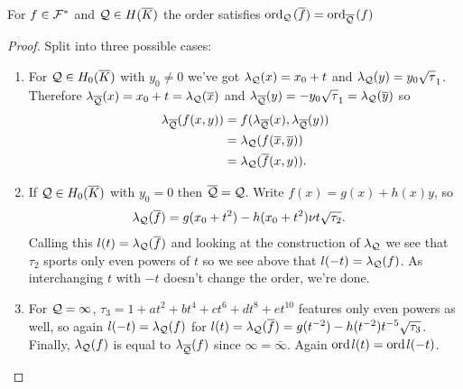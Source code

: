 \documentclass[english,11pt,a4paper]{article}
\begin{document}
\begin{lemma}\label{three}
  For $f \in \mathcal{F}^*$ and $\mathcal{Q} \in H(\overline K)$ the order satisfies $\text{ord}_{\mathcal{Q}}\hspace{0.4mm}(\overline f) = \text{ord}_{\overline {\mathcal{Q}}}\hspace{0.4mm} (f)$
  \begin{proof} Split into three possible cases:
    \begin{enumerate}[1.]
      \item For $\mathcal{Q} \in H_0(\overline K)$ with $y_0 \neq 0$ we've got $\lambda_{\mathcal{Q}}(x) = x_0 + t$ and $\lambda_{\mathcal{Q}}(y) = y_0 \sqrt \tau_1$. Therefore $\lambda_{\overline {\mathcal{Q}}}(x) = x_0 + t = \lambda_{\mathcal{Q}} (\overline x)$ and $\lambda_{\overline {\mathcal{Q}}}(y) = - y_0 \sqrt \tau_1 = \lambda_{\mathcal{Q}} (\overline y)$ so
      \begin{align*}
        \lambda_{\overline {\mathcal{Q}}} (f(x,y)) &= f(\lambda_{\overline {\mathcal{Q}}}(x) , \lambda_{\overline {\mathcal{Q}}}(y) ) \\
                      &= \lambda_{\mathcal{Q}} (f(\overline x, \overline y)) \\
                      &= \lambda_{\mathcal{Q}} (\overline f (x,y)).
      \end{align*}

      \item If $\mathcal{Q} \in H_0(\overline K)$ with $y_0 = 0$ then $\overline {\mathcal{Q}} = \mathcal{Q}$. Write $f(x) = g(x) + h(x)y$, so
      \begin{align*}
        \lambda_{\mathcal{Q}} (\overline f) &= g(x_0 + t^2) - h(x_0 + t^2) \nu t \sqrt{\tau_2}.
      \end{align*}
      Calling this $l(t) = \lambda_{\mathcal{Q}} (\overline f)$ and looking at the construction of $\lambda_{\mathcal{Q}}$ we see that $\tau_2$ sports only even powers of $t$ so we see above that $l(-t) = \lambda_{\mathcal{Q}} (f)$. As interchanging $t$ with $-t$ doesn't change the order, we're done.

      \item For $\mathcal{Q} = \infty$, $\tau_3 = 1 + a t^2 + b t^4 + c t^6 + d t^8 + e t^{10}$ features only even powers as well, so again $l(-t) = \lambda_{\mathcal{Q}} (f)$ for $l(t) = \lambda_{\mathcal{Q}} (\overline f) = g(t^{-2}) - h(t^{-2}) t^{-5} \sqrt{\tau_3}$. Finally, $\lambda_{\mathcal{Q}} (f)$ is equal to $\lambda_{\overline {\mathcal{Q}}} (f)$ since $\infty = \bar \infty$. Again $\text{ord\hspace{0.4mm}} l(t) = \text{ord\hspace{0.4mm}} l(-t)$.
    \end{enumerate}
  \end{proof}
\end{lemma}
\end{document}

